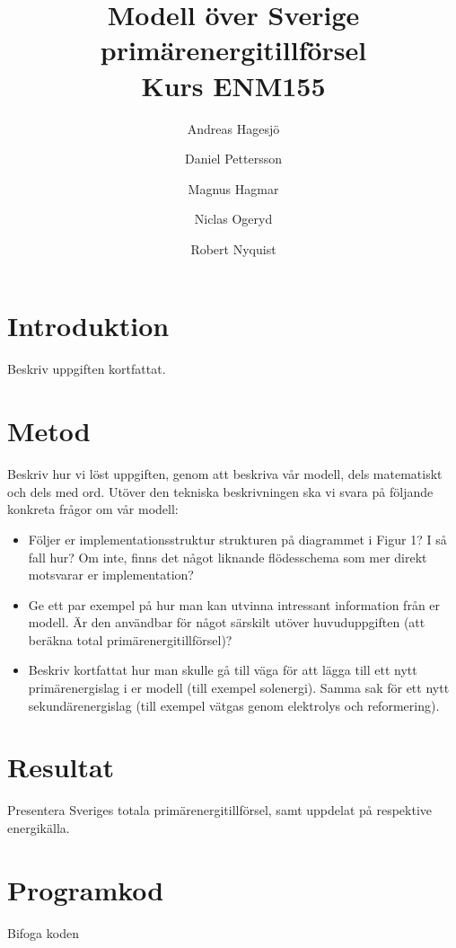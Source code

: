 \documentclass[a4paper,11pt,fleqn]{article}
\author{Andreas Hagesjö \and Daniel Pettersson \and
Magnus Hagmar \and Niclas Ogeryd \and Robert Nyquist}
\title{Modell över Sverige primärenergitillförsel \\ Kurs ENM155}
\begin{document}
\maketitle

\section{Introduktion}
Beskriv uppgiften kortfattat.

\section{Metod}
Beskriv hur vi löst uppgiften, genom att beskriva vår modell, dels
matematiskt och dels med ord. Utöver den tekniska beskrivningen ska vi
svara på följande konkreta frågor om vår modell:

\begin{itemize}
\item Följer er implementationsstruktur strukturen på diagrammet i Figur 1?
I så fall hur? Om inte, finns det något liknande flödesschema som mer
direkt motsvarar er implementation?

\item Ge ett par exempel på hur man kan utvinna intressant information från
er modell. Är den användbar för något särskilt utöver huvuduppgiften (att
beräkna total primärenergitillförsel)?

\item Beskriv kortfattat hur man skulle gå till väga för att lägga till ett
nytt primärenergislag i er modell (till exempel solenergi). Samma sak för
ett nytt sekundärenergislag (till exempel vätgas genom elektrolys och
reformering).
\end{itemize}

\section{Resultat}
Presentera Sveriges totala primärenergitillförsel, samt uppdelat på
respektive energikälla.

\appendix
\section{Programkod}
Bifoga koden
\end{document}
